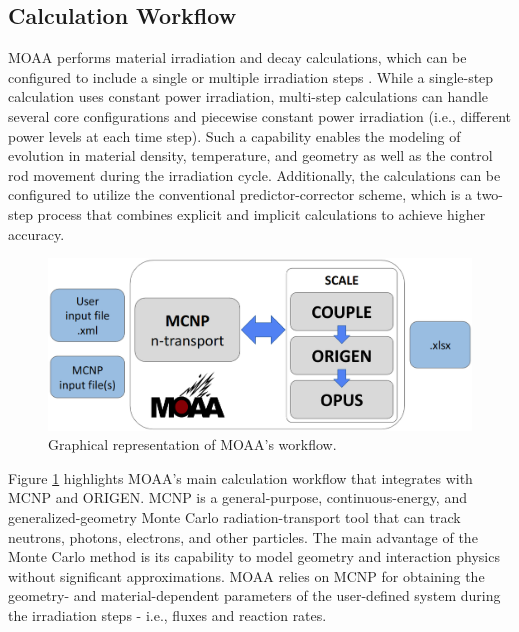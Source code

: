 \subsection{Calculation Workflow}

MOAA performs material irradiation and decay calculations, which can be configured to include a single or multiple irradiation steps \cite{fairhurst_development_2022}.
While a single-step calculation uses constant power irradiation, multi-step calculations can handle several core configurations and piecewise constant power irradiation (i.e., different power levels at each time step).
Such a capability enables the modeling of evolution in material density, temperature, and geometry as well as the control rod movement during the irradiation cycle.
Additionally, the calculations can be configured to utilize the conventional predictor-corrector scheme, which is a two-step process that combines explicit and implicit calculations to achieve higher accuracy.

\begin{figure}[htbp!]
  \begin{center}
    \includegraphics[scale=0.4]{figures/diagram_2}
  \end{center}
  \caption{Graphical representation of MOAA's workflow.}
  \label{fig:workflow_1}
\end{figure}

Figure \ref{fig:workflow_1} highlights MOAA's main calculation workflow that integrates with MCNP and ORIGEN.
MCNP is a general-purpose, continuous-energy, and generalized-geometry Monte Carlo radiation-transport tool that can track neutrons, photons, electrons, and other particles.
The main advantage of the Monte Carlo method is its capability to model geometry and interaction physics without significant approximations.
MOAA relies on MCNP for obtaining the geometry- and material-dependent parameters of the user-defined system during the irradiation steps - i.e., fluxes and reaction rates.

